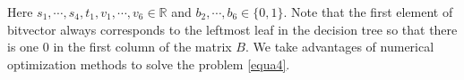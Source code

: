 \documentclass[UTF8]{article}
\begin{document}
Here $s_1,\cdots, s_4, t_1,  v_1,\cdots, v_6\in\mathbb{R}$ and $b_2,\cdots, b_6\in\{0,1\}$.
Note that the first element of bitvector always corresponds to the leftmost leaf in the decision tree
so that there is one $0$ in the first column of the matrix $B$.
We take advantages of numerical optimization methods to
solve the problem \eqref{equa4}.

\end{document}
